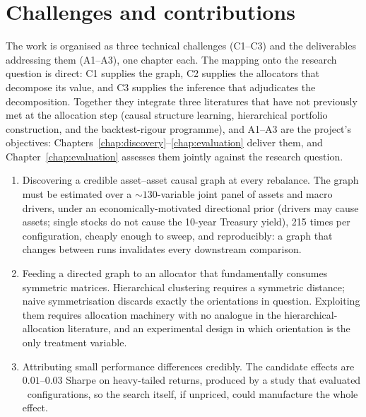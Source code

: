 \section{Challenges and contributions}
\label{sec:challenges}

The work is organised as three technical challenges (C1--C3) and the
deliverables addressing them (A1--A3), one chapter each. The mapping onto the
research question
is direct: C1 supplies the graph, C2 supplies the allocators that decompose
its value, and C3 supplies the inference that adjudicates the decomposition.
Together they integrate three literatures that have not previously met at
the allocation step (causal structure learning, hierarchical portfolio
construction, and the backtest-rigour programme), and A1--A3 are the
project's objectives: Chapters~\ref{chap:discovery}--\ref{chap:evaluation}
deliver them, and Chapter~\ref{chap:evaluation} assesses them jointly
against the research question.

\begin{enumerate}[label=C\arabic*, itemsep=2pt, topsep=3pt]
  \item Discovering a credible asset--asset causal graph at every
    rebalance. The graph must be estimated over a ${\sim}130$-variable joint
    panel of assets and macro drivers, under an economically-motivated
    directional prior (drivers may cause assets; single stocks do not cause
    the 10-year Treasury yield), 215 times per configuration, cheaply enough
    to sweep, and reproducibly: a graph that changes between runs
    invalidates every downstream comparison.
  \item Feeding a directed graph to an allocator that fundamentally
    consumes symmetric matrices. Hierarchical clustering requires a
    symmetric distance; naive symmetrisation discards exactly the
    orientations in question. Exploiting them requires allocation machinery
    with no analogue in the hierarchical-allocation literature, and an
    experimental design
    in which orientation is the only treatment variable.
  \item Attributing small performance differences credibly. The
    candidate effects are $0.01$--$0.03$ Sharpe on heavy-tailed returns,
    produced by a study that evaluated \rsNtrials\ configurations, so
    the search itself, if unpriced, could manufacture the whole effect.
\end{enumerate}

